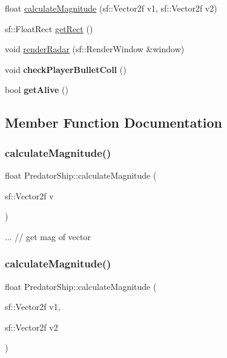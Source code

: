 \begin{DoxyCompactItemize}
$$\item 
float \mbox{\hyperlink{class_predator_ship_a8000ba5e3ef3024de39cc7763048af72}{calculate\+Magnitude}} (sf\+::\+Vector2f v1, sf\+::\+Vector2f v2)
\item 
sf\+::\+Float\+Rect \mbox{\hyperlink{class_predator_ship_a91fdb3bab56c53417c0fa33237768f64}{get\+Rect}} ()
\item 
void \mbox{\hyperlink{class_predator_ship_a4f32416e9d9175ec61bab70008ad709f}{render\+Radar}} (sf\+::\+Render\+Window \&window)
\item 
\mbox{\label{class_predator_ship_a7a85b35820234fa6cefa69b6108498e7}} 
void {\bfseries check\+Player\+Bullet\+Coll} ()
\item 
\mbox{\label{class_predator_ship_aae0461ff2cd58e4b6249d3375b297281}} 
bool {\bfseries get\+Alive} ()
\end{DoxyCompactItemize}


\subsection{Member Function Documentation}
\mbox{\label{class_predator_ship_acaef1f914f1cd32445977927fd4f2d85}} 
\subsubsection{\texorpdfstring{calculate\+Magnitude()}{calculateMagnitude()}\hspace{0.1cm}{\footnotesize\ttfamily [1/2]}}
{\footnotesize\ttfamily float Predator\+Ship\+::calculate\+Magnitude (\begin{DoxyParamCaption}\item[{sf\+::\+Vector2f}]{v }\end{DoxyParamCaption})}

... // get mag of vector\mbox{\label{class_predator_ship_a8000ba5e3ef3024de39cc7763048af72}} 
\subsubsection{\texorpdfstring{calculate\+Magnitude()}{calculateMagnitude()}\hspace{0.1cm}{\footnotesize\ttfamily [2/2]}}
{\footnotesize\ttfamily float Predator\+Ship\+::calculate\+Magnitude (\begin{DoxyParamCaption}\item[{sf\+::\+Vector2f}]{v1,  }\item[{sf\+::\+Vector2f}]{v2 }\end{DoxyParamCaption})}

